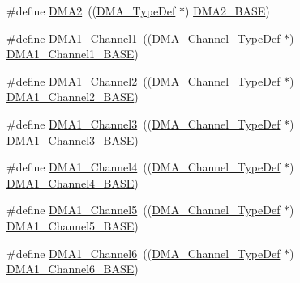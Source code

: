 \begin{DoxyCompactItemize}
\item 
\#define \hyperlink{group___peripheral__declaration_ga506520140eec1708bc7570c49bdf972d}{D\+M\+A2}~((\hyperlink{struct_d_m_a___type_def}{D\+M\+A\+\_\+\+Type\+Def} $\ast$) \hyperlink{openmotestm_2library_2inc_2stm32f10x__map_8h_ab72a9ae145053ee13d1d491fb5c1df64}{D\+M\+A2\+\_\+\+B\+A\+SE})
\item 
\#define \hyperlink{group___peripheral__declaration_gac83c5be824be1c02716e2522e80ddf7a}{D\+M\+A1\+\_\+\+Channel1}~((\hyperlink{struct_d_m_a___channel___type_def}{D\+M\+A\+\_\+\+Channel\+\_\+\+Type\+Def} $\ast$) \hyperlink{openmotestm_2library_2inc_2stm32f10x__map_8h_a888dbc1608243badeb3554ffedc7364c}{D\+M\+A1\+\_\+\+Channel1\+\_\+\+B\+A\+SE})
\item 
\#define \hyperlink{group___peripheral__declaration_ga23d7631dd10c645e06971b2543ba2949}{D\+M\+A1\+\_\+\+Channel2}~((\hyperlink{struct_d_m_a___channel___type_def}{D\+M\+A\+\_\+\+Channel\+\_\+\+Type\+Def} $\ast$) \hyperlink{openmotestm_2library_2inc_2stm32f10x__map_8h_a38a70090eef3687e83fa6ac0c6d22267}{D\+M\+A1\+\_\+\+Channel2\+\_\+\+B\+A\+SE})
\item 
\#define \hyperlink{group___peripheral__declaration_gacf7b6093a37b306d7f1f50b2f200f0d0}{D\+M\+A1\+\_\+\+Channel3}~((\hyperlink{struct_d_m_a___channel___type_def}{D\+M\+A\+\_\+\+Channel\+\_\+\+Type\+Def} $\ast$) \hyperlink{openmotestm_2library_2inc_2stm32f10x__map_8h_a70b3d9f36ca9ce95b4e421c11154fe5d}{D\+M\+A1\+\_\+\+Channel3\+\_\+\+B\+A\+SE})
\item 
\#define \hyperlink{group___peripheral__declaration_gad2c42743316bf64da557130061b1f56a}{D\+M\+A1\+\_\+\+Channel4}~((\hyperlink{struct_d_m_a___channel___type_def}{D\+M\+A\+\_\+\+Channel\+\_\+\+Type\+Def} $\ast$) \hyperlink{openmotestm_2library_2inc_2stm32f10x__map_8h_a1adc93cd0baf0897202c71110e045692}{D\+M\+A1\+\_\+\+Channel4\+\_\+\+B\+A\+SE})
\item 
\#define \hyperlink{group___peripheral__declaration_ga06ff98ddef3c962795d2e2444004abff}{D\+M\+A1\+\_\+\+Channel5}~((\hyperlink{struct_d_m_a___channel___type_def}{D\+M\+A\+\_\+\+Channel\+\_\+\+Type\+Def} $\ast$) \hyperlink{openmotestm_2library_2inc_2stm32f10x__map_8h_ac041a71cd6c1973964f847a68aa14478}{D\+M\+A1\+\_\+\+Channel5\+\_\+\+B\+A\+SE})
\item 
\#define \hyperlink{group___peripheral__declaration_gac013c4376e4797831b5ddd2a09519df8}{D\+M\+A1\+\_\+\+Channel6}~((\hyperlink{struct_d_m_a___channel___type_def}{D\+M\+A\+\_\+\+Channel\+\_\+\+Type\+Def} $\ast$) \hyperlink{openmotestm_2library_2inc_2stm32f10x__map_8h_a896c2c7585dd8bc3969cf8561f689d2d}{D\+M\+A1\+\_\+\+Channel6\+\_\+\+B\+A\+SE})

\end{DoxyCompactItemize}
